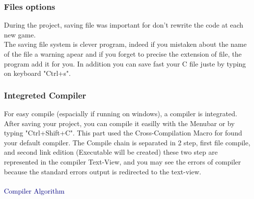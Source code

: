 \documentclass[11pt]{sample}
\begin{document}
\subsubsection{Files options}
During the project, saving file was important for don't rewrite the code at each new game.\\
 The saving file system is clever program, indeed if you mistaken about the name of the file a warning apear and if you forget to precise the extension of file, the program add it for you. In addition you can save fast your C file juste by typing on keyboard "Ctrl+s". 
\subsubsection{Integreted Compiler}
For easy compile (espacially if running on windows), a compiler is integrated. After saving your project, you can compile it easilly with the Menubar or by typing "Ctrl+Shift+C". This part used the Cross-Compilation Macro for found your default compiler\footnotemark.
 The Compile chain is separated in 2 step, first file compile, and second link edition (Executable will be created) these two step are represented in the compiler Text-View, and you may see the errors of compiler because the standard errors output is redirected to the text-view.\\\\
\textcolor{Navy}{Compiler Algorithm\footnotemark}
\end{document}
